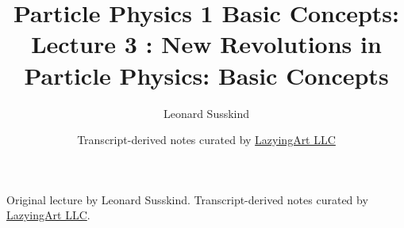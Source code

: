 \documentclass[11pt,oneside]{book}
\begin{document}
\frontmatter
\title{Particle Physics 1 Basic Concepts: Lecture 3 : New Revolutions in Particle Physics: Basic Concepts}
\author{Leonard Susskind}
\date{Transcript-derived notes curated by \href{https://lazying.art}{LazyingArt LLC}}
\maketitle
\begin{center}
\small Original lecture by Leonard Susskind. Transcript-derived notes curated by \href{https://lazying.art}{LazyingArt LLC}.
\end{center}
\clearpage
\mainmatter

\end{document}
